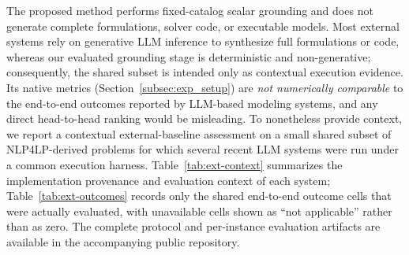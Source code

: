 \documentclass[pdflatex,sn-basic,Numbered]{sn-jnl}
\begin{document}
The proposed method performs fixed-catalog scalar grounding and does not generate complete formulations, solver code, or executable models. Most external systems rely on generative LLM inference to synthesize full formulations or code, whereas our evaluated grounding stage is deterministic and non-generative; consequently, the shared subset is intended only as contextual execution evidence. Its native metrics (Section~\ref{subsec:exp_setup}) are \emph{not numerically comparable} to the end-to-end outcomes reported by LLM-based modeling systems, and any direct head-to-head ranking would be misleading. To nonetheless provide context, we report a contextual external-baseline assessment on a small shared subset of \textsc{NLP4LP}-derived problems for which several recent LLM systems were run under a common execution harness. Table~\ref{tab:ext-context} summarizes the implementation provenance and evaluation context of each system; Table~\ref{tab:ext-outcomes} records only the shared end-to-end outcome cells that were actually evaluated, with unavailable cells shown as ``not applicable'' rather than as zero. The complete protocol and per-instance evaluation artifacts are available in the accompanying public repository.
\end{document}
